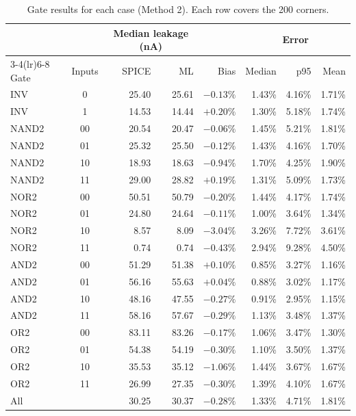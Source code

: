 \documentclass[11pt]{article}
\begin{document}
\begin{table}[H]
\centering\small
\begin{tabular}{lcrrrrrr}
\toprule
     &        & \multicolumn{2}{c}{Median leakage (nA)} & & \multicolumn{3}{c}{Error} \\
\cmidrule(lr){3-4}\cmidrule(lr){6-8}
Gate & Inputs & SPICE & ML & Bias & Median & p95 & Mean \\
\midrule
INV   & 0  & 25.40 & 25.61 & $-0.13\%$ & 1.43\% & 4.16\% & 1.71\% \\
INV   & 1  & 14.53 & 14.44 & $+0.20\%$ & 1.30\% & 5.18\% & 1.74\% \\
\midrule
NAND2 & 00 & 20.54 & 20.47 & $-0.06\%$ & 1.45\% & 5.21\% & 1.81\% \\
NAND2 & 01 & 25.32 & 25.50 & $-0.12\%$ & 1.43\% & 4.16\% & 1.70\% \\
NAND2 & 10 & 18.93 & 18.63 & $-0.94\%$ & 1.70\% & 4.25\% & 1.90\% \\
NAND2 & 11 & 29.00 & 28.82 & $+0.19\%$ & 1.31\% & 5.09\% & 1.73\% \\
\midrule
NOR2  & 00 & 50.51 & 50.79 & $-0.20\%$ & 1.44\% & 4.17\% & 1.74\% \\
NOR2  & 01 & 24.80 & 24.64 & $-0.11\%$ & 1.00\% & 3.64\% & 1.34\% \\
NOR2  & 10 & 8.57  & 8.09  & $-3.04\%$ & 3.26\% & 7.72\% & 3.61\% \\
NOR2  & 11 & 0.74  & 0.74  & $-0.43\%$ & 2.94\% & 9.28\% & 4.50\% \\
\midrule
AND2  & 00 & 51.29 & 51.38 & $+0.10\%$ & 0.85\% & 3.27\% & 1.16\% \\
AND2  & 01 & 56.16 & 55.63 & $+0.04\%$ & 0.88\% & 3.02\% & 1.17\% \\
AND2  & 10 & 48.16 & 47.55 & $-0.27\%$ & 0.91\% & 2.95\% & 1.15\% \\
AND2  & 11 & 58.16 & 57.67 & $-0.29\%$ & 1.13\% & 3.48\% & 1.37\% \\
\midrule
OR2   & 00 & 83.11 & 83.26 & $-0.17\%$ & 1.06\% & 3.47\% & 1.30\% \\
OR2   & 01 & 54.38 & 54.19 & $-0.30\%$ & 1.10\% & 3.50\% & 1.37\% \\
OR2   & 10 & 35.53 & 35.12 & $-1.06\%$ & 1.44\% & 3.67\% & 1.67\% \\
OR2   & 11 & 26.99 & 27.35 & $-0.30\%$ & 1.39\% & 4.10\% & 1.67\% \\
\midrule
All   &    & 30.25 & 30.37 & $-0.28\%$ & 1.33\% & 4.71\% & 1.81\% \\
\bottomrule
\end{tabular}
\caption{Gate results for each case (Method 2). Each row covers the 200
corners.}
\label{tab:gateresults}
\end{table}
\end{document}
